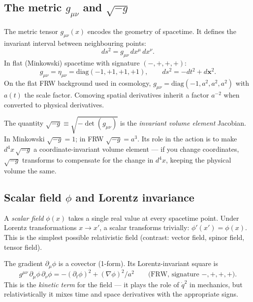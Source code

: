 \documentclass[12pt]{article}
\begin{document}
\subsection{The metric $g_{\mu\nu}$ and $\sqrt{-g}$}
\label{app:metric}

The metric tensor $g_{\mu\nu}(x)$ encodes the geometry of spacetime.
It defines the invariant interval between neighbouring points:
%
\begin{equation}
  ds^2 = g_{\mu\nu}\,dx^\mu\,dx^\nu.
\end{equation}
%
In flat (Minkowski) spacetime with signature $(-,+,+,+)$:
%
\begin{equation}
  g_{\mu\nu} = \eta_{\mu\nu} = \mathrm{diag}(-1, +1, +1, +1),
  \qquad
  ds^2 = -dt^2 + d\mathbf x^2.
\end{equation}
%
On the flat FRW background used in cosmology,
$g_{\mu\nu} = \mathrm{diag}(-1, a^2, a^2, a^2)$ with $a(t)$ the scale
factor.  Comoving spatial derivatives inherit a factor $a^{-2}$ when
converted to physical derivatives.

The quantity $\sqrt{-g} \equiv \sqrt{-\det(g_{\mu\nu})}$ is the
\emph{invariant volume element} Jacobian.  In Minkowski
$\sqrt{-g} = 1$; in FRW $\sqrt{-g} = a^3$.  Its role in the action is
to make $d^4x\,\sqrt{-g}$ a coordinate-invariant volume element ---
if you change coordinates, $\sqrt{-g}$ transforms to compensate for
the change in $d^4x$, keeping the physical volume the same.

\subsection{Scalar field $\phi$ and Lorentz invariance}
\label{app:scalar}

A \emph{scalar field} $\phi(x)$ takes a single real value at every
spacetime point.  Under Lorentz transformations $x\to x'$, a scalar
transforms trivially: $\phi'(x') = \phi(x)$.  This is the simplest
possible relativistic field (contrast: vector field, spinor field,
tensor field).

The gradient $\partial_\mu\phi$ is a covector (1-form).  Its
Lorentz-invariant square is
%
\begin{equation}
  g^{\mu\nu}\,\partial_\mu\phi\,\partial_\nu\phi
    = -(\partial_t\phi)^2 + (\nabla\phi)^2/a^2
  \qquad \text{(FRW, signature $-,+,+,+$)}.
\end{equation}
%
This is the \emph{kinetic term} for the field --- it plays the role
of $\dot q^2$ in mechanics, but relativistically it mixes time and
space derivatives with the appropriate signs.
\end{document}
